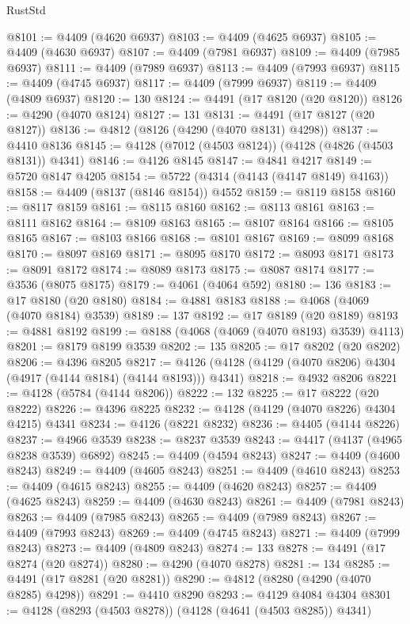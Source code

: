 \begin{lexlean}{RustStd}
\begin{coremodule}
@8101 := @4409 (@4620 @6937)
@8103 := @4409 (@4625 @6937)
@8105 := @4409 (@4630 @6937)
@8107 := @4409 (@7981 @6937)
@8109 := @4409 (@7985 @6937)
@8111 := @4409 (@7989 @6937)
@8113 := @4409 (@7993 @6937)
@8115 := @4409 (@4745 @6937)
@8117 := @4409 (@7999 @6937)
@8119 := @4409 (@4809 @6937)
@8120 := 130
@8124 := @4491 (@17 @8120 (@20 @8120))
@8126 := @4290 (@4070 @8124)
@8127 := 131
@8131 := @4491 (@17 @8127 (@20 @8127))
@8136 := @4812 (@8126 (@4290 (@4070 @8131) @4298))
@8137 := @4410 @8136
@8145 := @4128 (@7012 (@4503 @8124)) (@4128 (@4826 (@4503 @8131)) @4341)
@8146 := @4126 @8145
@8147 := @4841 @4217
@8149 := @5720 @8147 @4205
@8154 := @5722 (@4314 (@4143 (@4147 @8149) @4163))
@8158 := @4409 (@8137 (@8146 @8154)) @4552
@8159 := @8119 @8158
@8160 := @8117 @8159
@8161 := @8115 @8160
@8162 := @8113 @8161
@8163 := @8111 @8162
@8164 := @8109 @8163
@8165 := @8107 @8164
@8166 := @8105 @8165
@8167 := @8103 @8166
@8168 := @8101 @8167
@8169 := @8099 @8168
@8170 := @8097 @8169
@8171 := @8095 @8170
@8172 := @8093 @8171
@8173 := @8091 @8172
@8174 := @8089 @8173
@8175 := @8087 @8174
@8177 := @3536 (@8075 @8175)
@8179 := @4061 (@4064 @592)
@8180 := 136
@8183 := @17 @8180 (@20 @8180)
@8184 := @4881 @8183
@8188 := @4068 (@4069 (@4070 @8184) @3539)
@8189 := 137
@8192 := @17 @8189 (@20 @8189)
@8193 := @4881 @8192
@8199 := @8188 (@4068 (@4069 (@4070 @8193) @3539) @4113)
@8201 := @8179 @8199 @3539
@8202 := 135
@8205 := @17 @8202 (@20 @8202)
@8206 := @4396 @8205
@8217 := @4126 (@4128 (@4129 (@4070 @8206) @4304 (@4917 (@4144 @8184) (@4144 @8193))) @4341)
@8218 := @4932 @8206
@8221 := @4128 (@5784 (@4144 @8206))
@8222 := 132
@8225 := @17 @8222 (@20 @8222)
@8226 := @4396 @8225
@8232 := @4128 (@4129 (@4070 @8226) @4304 @4215) @4341
@8234 := @4126 (@8221 @8232)
@8236 := @4405 (@4144 @8226)
@8237 := @4966 @3539
@8238 := @8237 @3539
@8243 := @4417 (@4137 (@4965 @8238 @3539) @6892)
@8245 := @4409 (@4594 @8243)
@8247 := @4409 (@4600 @8243)
@8249 := @4409 (@4605 @8243)
@8251 := @4409 (@4610 @8243)
@8253 := @4409 (@4615 @8243)
@8255 := @4409 (@4620 @8243)
@8257 := @4409 (@4625 @8243)
@8259 := @4409 (@4630 @8243)
@8261 := @4409 (@7981 @8243)
@8263 := @4409 (@7985 @8243)
@8265 := @4409 (@7989 @8243)
@8267 := @4409 (@7993 @8243)
@8269 := @4409 (@4745 @8243)
@8271 := @4409 (@7999 @8243)
@8273 := @4409 (@4809 @8243)
@8274 := 133
@8278 := @4491 (@17 @8274 (@20 @8274))
@8280 := @4290 (@4070 @8278)
@8281 := 134
@8285 := @4491 (@17 @8281 (@20 @8281))
@8290 := @4812 (@8280 (@4290 (@4070 @8285) @4298))
@8291 := @4410 @8290
@8293 := @4129 @4084 @4304
@8301 := @4128 (@8293 (@4503 @8278)) (@4128 (@4641 (@4503 @8285)) @4341)

\end{coremodule}
\end{lexlean}
